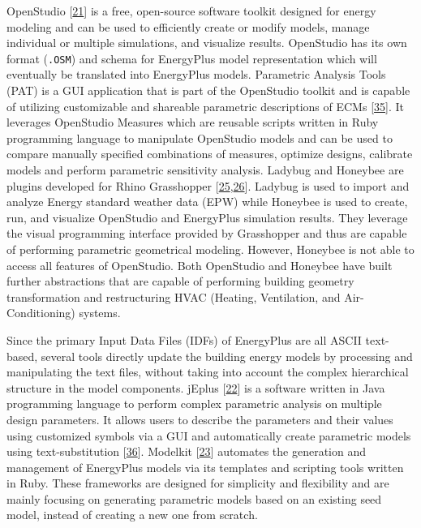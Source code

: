 \documentclass[3p, times]{elsarticle} %
\begin{document}
OpenStudio {[}\protect\hyperlink{ref-Guglielmetti2011}{21}{]} is a free, open-source software toolkit designed
for energy modeling and can be used to efficiently create or modify models,
manage individual or multiple simulations, and visualize results. OpenStudio has
its own format (\texttt{.OSM}) and schema for EnergyPlus model representation which
will eventually be translated into EnergyPlus models. Parametric Analysis Tools
(PAT) is a GUI application that is part of the OpenStudio toolkit and is capable
of utilizing customizable and shareable parametric descriptions of ECMs
{[}\protect\hyperlink{ref-Parker2014}{35}{]}. It leverages OpenStudio Measures which are reusable scripts
written in Ruby programming language to manipulate OpenStudio models and can be
used to compare manually specified combinations of measures, optimize designs,
calibrate models and perform parametric sensitivity analysis. Ladybug and
Honeybee are plugins developed for Rhino Grasshopper {[}\protect\hyperlink{ref-Roudsari2013}{25},\protect\hyperlink{ref-Tabadkani2019}{26}{]}. Ladybug is used to import and analyze Energy standard weather
data (EPW) while Honeybee is used to create, run, and visualize OpenStudio and
EnergyPlus simulation results. They leverage the visual programming interface
provided by Grasshopper and thus are capable of performing parametric
geometrical modeling. However, Honeybee is not able to access all features of
OpenStudio. Both OpenStudio and Honeybee have built further abstractions that
are capable of performing building geometry transformation and restructuring
HVAC (Heating, Ventilation, and Air-Conditioning) systems.

Since the primary Input Data Files (IDFs) of EnergyPlus are all ASCII
text-based, several tools directly update the building energy models by
processing and manipulating the text files, without taking into account the
complex hierarchical structure in the model components. jEplus {[}\protect\hyperlink{ref-Yi2020}{22}{]} is a
software written in Java programming language to perform complex parametric
analysis on multiple design parameters. It allows users to describe the
parameters and their values using customized symbols via a GUI and automatically
create parametric models using text-substitution {[}\protect\hyperlink{ref-Zhang2010a}{36}{]}. Modelkit
{[}\protect\hyperlink{ref-BigLadderSoftware2020}{23}{]} automates the generation and management of EnergyPlus
models via its templates and scripting tools written in Ruby. These frameworks
are designed for simplicity and flexibility and are mainly focusing on
generating parametric models based on an existing seed model, instead of
creating a new one from scratch.
\end{document}
